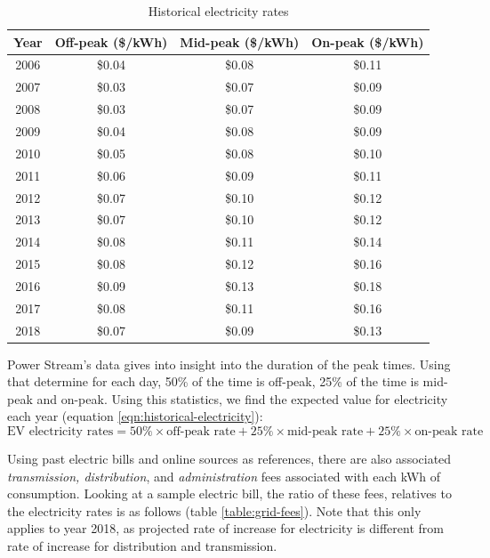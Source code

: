 \documentclass[10pt,letterpaper]{article}
\begin{document}
\begin{table}[H]
	\centering
	\begin{tabular}{|c|c|c|c|}
		\hline
		Year & Off-peak (\$/kWh) & Mid-peak (\$/kWh) &  On-peak (\$/kWh)\\
		\hline
		2006 & \$0.04 & \$0.08 & \$0.11\\
		2007 & \$0.03 & \$0.07 & \$0.09\\
		2008 & \$0.03 & \$0.07 & \$0.09\\
		2009 & \$0.04 & \$0.08 & \$0.09\\
		2010 & \$0.05 & \$0.08 & \$0.10\\
		2011 & \$0.06 & \$0.09 & \$0.11\\
		2012 & \$0.07 & \$0.10 & \$0.12\\
		2013 & \$0.07 & \$0.10 & \$0.12\\
		2014 & \$0.08 & \$0.11 & \$0.14\\
		2015 & \$0.08 & \$0.12 & \$0.16\\
		2016 & \$0.09 & \$0.13 & \$0.18\\
		2017 & \$0.08 & \$0.11 & \$0.16\\
		2018 & \$0.07 & \$0.09 & \$0.13\\
		\hline
	\end{tabular}
	\caption{Historical electricity rates}
	\label{table:grid-history}
\end{table}

Power Stream's data gives into insight into the duration of the peak times. Using that determine for each day, 50\% of the time is off-peak, 25\% of the time is mid-peak and on-peak\cite{powerstreamTOU}. Using this statistics, we find the expected value for electricity each year (equation \ref{eqn:historical-electricity}):\\

\begin{equation}
	\text{EV electricity rates}=50\%\times\text{off-peak rate}+25\%\times \text{mid-peak rate}+25\%\times\text{on-peak rate}
	\label{eqn:historical-electricity}
\end{equation}

Using past electric bills and online sources as references, there are also associated \textit{transmission, distribution}, and \textit{administration} fees associated with each kWh of consumption. Looking at a sample electric bill, the ratio of these fees, relatives to the electricity rates is as follows (table \ref{table:grid-fees}). Note that this only applies to year 2018, as projected rate of increase for electricity is different from rate of increase for distribution and transmission.\\
\end{document}
